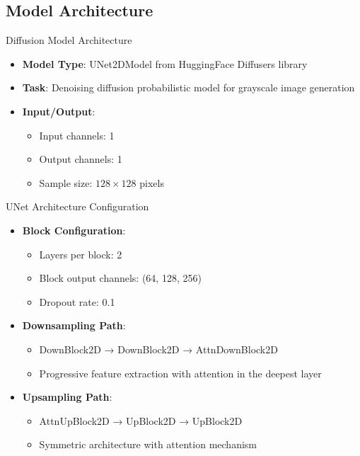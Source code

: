 \subsection{Model Architecture}

\begin{frame}{Diffusion Model Architecture}
    \begin{itemize}
        \item \textbf{Model Type}: UNet2DModel from HuggingFace Diffusers library
        \item \textbf{Task}: Denoising diffusion probabilistic model for grayscale image generation
        \item \textbf{Input/Output}:
              \begin{itemize}
                  \item Input channels: 1
                  \item Output channels: 1
                  \item Sample size: $128 \times 128$ pixels
              \end{itemize}
    \end{itemize}
\end{frame}

\begin{frame}{UNet Architecture Configuration}
    \begin{itemize}
        \item \textbf{Block Configuration}:
              \begin{itemize}
                  \item Layers per block: 2
                  \item Block output channels: (64, 128, 256)
                  \item Dropout rate: 0.1
              \end{itemize}
        \item \textbf{Downsampling Path}:
              \begin{itemize}
                  \item DownBlock2D → DownBlock2D → AttnDownBlock2D
                  \item Progressive feature extraction with attention in the deepest layer
              \end{itemize}
        \item \textbf{Upsampling Path}:
              \begin{itemize}
                  \item AttnUpBlock2D → UpBlock2D → UpBlock2D
                  \item Symmetric architecture with attention mechanism
              \end{itemize}
    \end{itemize}
\end{frame}

